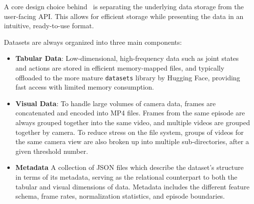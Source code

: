 A core design choice behind \lerobotdataset~is separating the underlying data storage from the user-facing API.
This allows for efficient storage while presenting the data in an intuitive, ready-to-use format.

Datasets are always organized into three main components:
\begin{itemize}
\item \textbf{Tabular Data}: Low-dimensional, high-frequency data such as joint states and actions are stored in efficient memory-mapped files, and typically offloaded to the more mature \texttt{datasets} library by Hugging Face, providing fast access with limited memory consumption.
\item \textbf{Visual Data}: To handle large volumes of camera data, frames are concatenated and encoded into MP4 files. Frames from the same episode are always grouped together into the same video, and multiple videos are grouped together by camera. To reduce stress on the file system, groups of videos for the same camera view are also broken up into multiple sub-directories, after a given threshold number.
\item \textbf{Metadata} A collection of JSON files which describe the dataset's structure in terms of its metadata, serving as the relational counterpart to both the tabular and visual dimensions of data. Metadata includes the different feature schema, frame rates, normalization statistics, and episode boundaries.
\end{itemize}

